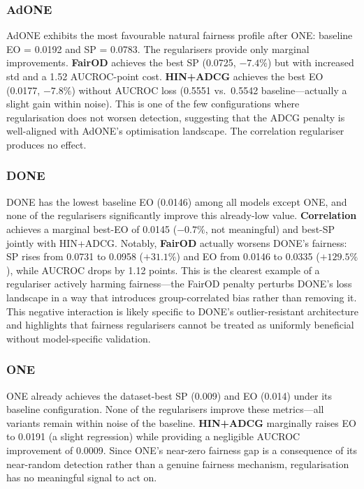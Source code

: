 \documentclass[sigconf,natbib=false]{acmart}
\begin{document}
\subsubsection{AdONE}

AdONE exhibits the most favourable natural fairness profile after ONE: baseline EO = 0.0192 and SP = 0.0783. The regularisers provide only marginal improvements. \textbf{FairOD} achieves the best SP (0.0725, $-7.4\%$) but with increased std and a 1.52 AUCROC-point cost. \textbf{HIN+ADCG} achieves the best EO (0.0177, $-7.8\%$) without AUCROC loss (0.5551 vs.\ 0.5542 baseline—actually a slight gain within noise). This is one of the few configurations where regularisation does not worsen detection, suggesting that the ADCG penalty is well-aligned with AdONE's optimisation landscape. The correlation regulariser produces no effect.

\subsubsection{DONE}

DONE has the lowest baseline EO (0.0146) among all models except ONE, and none of the regularisers significantly improve this already-low value. \textbf{Correlation} achieves a marginal best-EO of 0.0145 ($-0.7\%$, not meaningful) and best-SP jointly with HIN+ADCG. Notably, \textbf{FairOD} actually worsens DONE's fairness: SP rises from 0.0731 to 0.0958 ($+31.1\%$) and EO from 0.0146 to 0.0335 ($+129.5\%$), while AUCROC drops by 1.12 points. This is the clearest example of a regulariser actively harming fairness—the FairOD penalty perturbs DONE's loss landscape in a way that introduces group-correlated bias rather than removing it. This negative interaction is likely specific to DONE's outlier-resistant architecture and highlights that fairness regularisers cannot be treated as uniformly beneficial without model-specific validation.

\subsubsection{ONE}

ONE already achieves the dataset-best SP (0.009) and EO (0.014) under its baseline configuration. None of the regularisers improve these metrics—all variants remain within noise of the baseline. \textbf{HIN+ADCG} marginally raises EO to 0.0191 (a slight regression) while providing a negligible AUCROC improvement of 0.0009. Since ONE's near-zero fairness gap is a consequence of its near-random detection rather than a genuine fairness mechanism, regularisation has no meaningful signal to act on.
\end{document}
